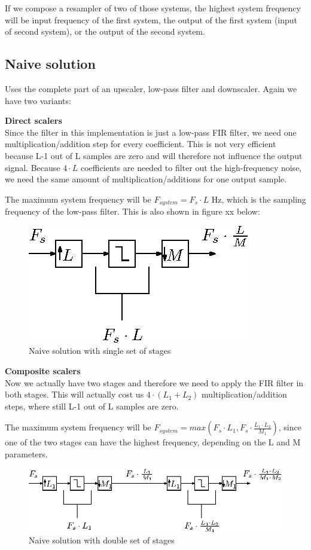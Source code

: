 \documentclass[a4paper,twoside,11pt, fleqn]{article}
\begin{document}
\smallskip
If we compose a resampler of two of those systems, the highest system frequency will be input frequency of the first system, the output of the first system (input of second system), or the output of the second system.

\subsection{Naive solution}
Uses the complete part of an upscaler, low-pass filter and downscaler. Again we have two variants:

\smallskip
\textbf{Direct scalers}\\
Since the filter in this implementation is just a low-pass FIR filter, we need one multiplication/addition step for every coefficient. This is not very efficient because L-1 out of L samples are zero and will therefore not influence the output signal. Because $4\cdot L$ coefficients are needed to filter out the high-frequency noise, we need the same amount of multiplication/additions for one output sample.

\smallskip
The maximum system frequency will be $F_{system} = F_s\cdot L$ Hz, which is the sampling frequency of the low-pass filter. This is also shown in figure xx below:
\begin{figure}[h]
	\includegraphics[scale = 1]{Images/3_0}
    \caption{Naive solution with single set of stages}
\end{figure}

\newpage
\textbf{Composite scalers } \\
Now we actually have two stages and therefore we need to apply the FIR filter in both stages. This will actually cost us $4\cdot (L_1 + L_2)$ multiplication/addition steps, where still L-1 out of L samples are zero.

\smallskip
The maximum system frequency will be $F_{system} = max(F_s\cdot L_1, F_s\cdot \frac{L_1\cdot L_2}{M_1})$, since one of the two stages can have the highest frequency, depending on the L and M parameters.
\begin{figure}[h]
	\includegraphics[scale = 1]{Images/3_1}
    \caption{Naive solution with double set of stages}
\end{figure}
\end{document}
